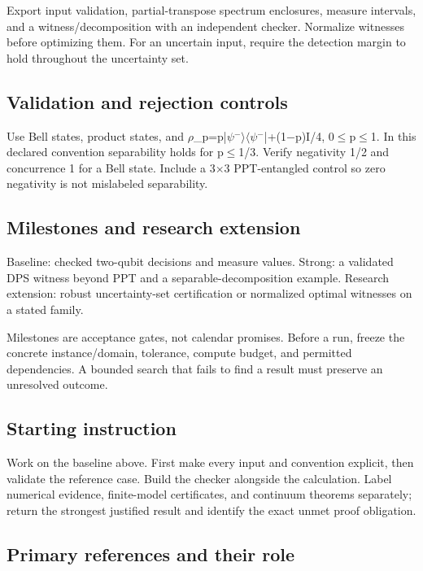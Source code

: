 \documentclass[
  11pt,
]{article}
\begin{document}
Export input validation, partial-transpose spectrum enclosures, measure
intervals, and a witness/decomposition with an independent checker.
Normalize witnesses before optimizing them. For an uncertain input,
require the detection margin to hold throughout the uncertainty set.

\subsection{Validation and rejection controls}

Use Bell states, product states, and
\ensuremath{\rho}\_p=p|\ensuremath{\psi}\ensuremath{{}^{-}}\ensuremath{\rangle}\ensuremath{\langle}\ensuremath{\psi}\ensuremath{{}^{-}}|+(1\ensuremath{-}p)I/4,
0\ensuremath{\le}p\ensuremath{\le}1. In this declared convention
separability holds for p\ensuremath{\le}1/3. Verify negativity 1/2 and
concurrence 1 for a Bell state. Include a 3\ensuremath{\times}3
PPT-entangled control so zero negativity is not mislabeled separability.

\subsection{Milestones and research extension}

Baseline: checked two-qubit decisions and measure values. Strong: a
validated DPS witness beyond PPT and a separable-decomposition example.
Research extension: robust uncertainty-set certification or normalized
optimal witnesses on a stated family.

Milestones are acceptance gates, not calendar promises. Before a run,
freeze the concrete instance/domain, tolerance, compute budget, and
permitted dependencies. A bounded search that fails to find a result
must preserve an unresolved outcome.

\subsection{Starting instruction}

Work on the baseline above. First make every input and convention
explicit, then validate the reference case. Build the checker alongside
the calculation. Label numerical evidence, finite-model certificates,
and continuum theorems separately; return the strongest justified result
and identify the exact unmet proof obligation.

\subsection{Primary references and their role}
\end{document}
